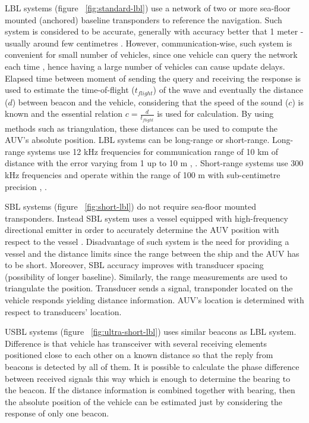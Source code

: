 LBL systems (figure ~\ref{fig:standard-lbl}) use a network of two or more sea-floor mounted (anchored) baseline transponders to reference the navigation. Such system is considered to be accurate, generally with accuracy better that 1 meter - usually around few centimetres \cite{noaa01}. However, communication-wise, such system is convenient for small number of vehicles, since one vehicle can query the network each time \cite{bahr08}, hence having a large number of vehicles can cause update delays. Elapsed time between moment of sending the query and receiving the response is used to estimate the time-of-flight ($t_{flight}$) of the wave and eventually the distance ($d$) between beacon and the vehicle, considering that the speed of the sound ($c$) is known and the essential relation $c = \frac{d}{t_{flight}}$ is used for calculation. By using methods such as triangulation, these distances can be used to compute the AUV's absolute position. LBL systems can be long-range or short-range. Long-range systems use 12 kHz frequencies for communication range of 10 km of distance with the error varying from 1 up to 10 m \cite{whitcomb99combined}, \cite{bahr08}. Short-range systems use 300 kHz frequencies and operate within the range of 100 m with sub-centimetre precision \cite{whitcomb99combined}, \cite{bahr08}. 
 
SBL systems (figure ~\ref{fig:short-lbl}) do not require sea-floor mounted transponders. Instead SBL system uses a vessel equipped with high-frequency directional emitter in order to accurately determine the AUV position with respect to the vessel \cite{maurelli08}. Disadvantage of such system is the need for providing a vessel and the distance limits since the range between the ship and the AUV has to be short. Moreover, SBL accuracy improves with transducer spacing (possibility of longer baseline). Similarly, the range measurements are used to triangulate the position. Transducer sends a signal, transponder located on the vehicle responds yielding distance information. AUV's location is determined with respect to transducers' location.

USBL systems (figure ~\ref{fig:ultra-short-lbl}) uses similar beacons as LBL system. Difference is that vehicle has transceiver with several receiving elements positioned close to each other on a known distance so that the reply from beacons is detected by all of them. It is possible to calculate the phase difference between received signals this way which is enough to determine the bearing to the beacon. If the distance information is combined together with bearing, then the absolute position of the vehicle can be estimated just by considering the response of only one beacon. 

